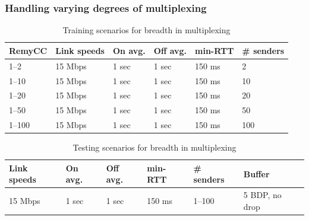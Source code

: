 \begin{frame}
\frametitle{Handling varying degrees of multiplexing}
\begin{table}
\begin{center}
\begin{scriptsize}
\begin{tabular}{l|l|l|l|l|l}
\bf RemyCC & \bf Link speeds & \bf On avg. & \bf Off avg. & \bf min-RTT &
\bf \# senders \\
\hline
1--2     & 15 Mbps & 1 sec & 1 sec & 150 ms & 2 \\
1--10    & 15 Mbps & 1 sec & 1 sec & 150 ms & 10 \\
1--20    & 15 Mbps & 1 sec & 1 sec & 150 ms & 20 \\
1--50    & 15 Mbps & 1 sec & 1 sec & 150 ms & 50 \\
1--100   & 15 Mbps & 1 sec & 1 sec & 150 ms & 100 \\
\end{tabular}
\end{scriptsize}
\caption{Training scenarios for breadth in multiplexing}
\label{table:multiplexing}
\end{center}
\end{table}

\begin{table}
\begin{center}
\begin{scriptsize}
\begin{tabular}{l|l|l|l|l|l}
\bf Link speeds & \bf On avg. & \bf Off avg. & \bf min-RTT &
\bf \# senders & Buffer \\
\hline
15 Mbps & 1 sec & 1 sec & 150 ms & 1--100 & 5 BDP, no drop \\
\end{tabular}
\end{scriptsize}
\caption{Testing scenarios for breadth in multiplexing}
\label{table:muxtesting}
\end{center}
\end{table}

\end{frame}

